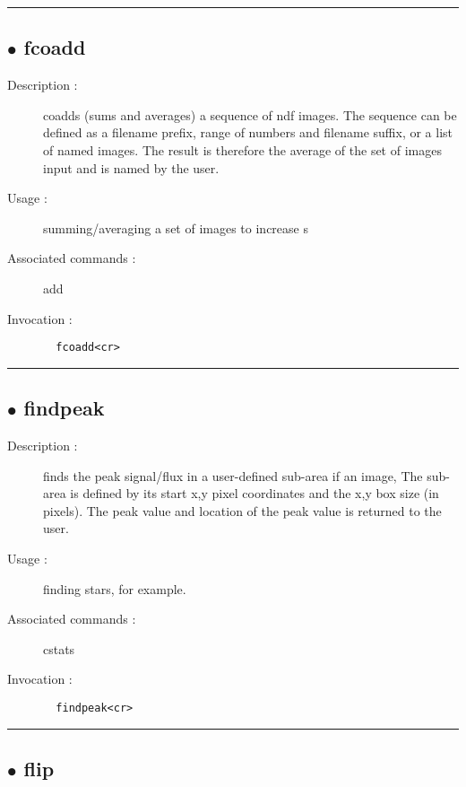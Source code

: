 \hrule \subsection*{$\bullet$ fcoadd}
\begin{description}
\item[Description :] coadds (sums and averages) a sequence of ndf images.  The
sequence can be defined as a filename prefix, range of numbers and
filename suffix, or a list of named images.  The result is therefore the
average of the set of images input and is named by the user.
\item[Usage :] summing/averaging a set of images to increase s
\item[Associated commands :] add
\item[Invocation :]

\verb+  fcoadd<cr> +\end{description}

\hrule \subsection*{$\bullet$ findpeak}
\begin{description}
\item[Description :] finds the peak signal/flux in a user-defined sub-area if an
image, The sub-area is defined by its start x,y pixel coordinates and the
x,y box size (in pixels).  The peak value and location of the peak value
is returned to the user.
\item[Usage :] finding stars, for example.
\item[Associated commands :] cstats
\item[Invocation :]

\verb+  findpeak<cr> +\end{description}

\hrule \subsection*{$\bullet$ flip}

